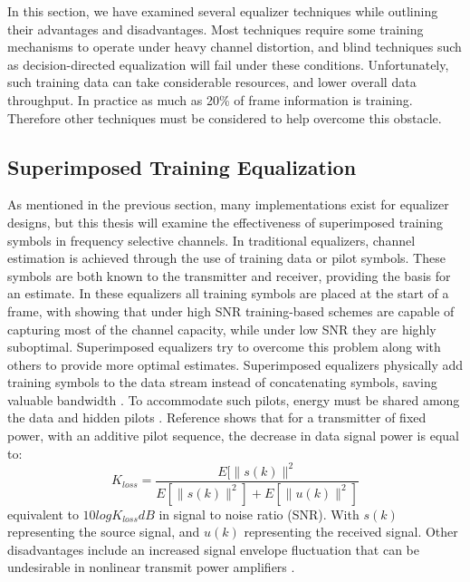 In this section, we have examined several equalizer techniques while outlining their advantages and disadvantages.  Most techniques require some training mechanisms to operate under heavy channel distortion, and blind techniques such as decision-directed equalization will fail under these conditions.  Unfortunately, such training data can take considerable resources, and lower overall data throughput.  In practice as much as 20\% of frame information is training.  Therefore other techniques must be considered to help overcome this obstacle.\\


\subsection{Superimposed Training Equalization}

As mentioned in the previous section, many implementations exist for equalizer designs, but this thesis will examine the effectiveness of superimposed training symbols in frequency selective channels.  In traditional equalizers, channel estimation is achieved through the use of training data or pilot symbols.  These symbols are both known to the transmitter and receiver, providing the basis for an estimate.  In these equalizers all training symbols are placed at the start of a frame, with \cite{16} showing that under high SNR training-based schemes are capable of capturing most of the channel capacity, while under low SNR they are highly suboptimal.  Superimposed equalizers try to overcome this problem along with others to provide more optimal estimates.  Superimposed equalizers physically add training symbols to the data stream instead of concatenating symbols, saving valuable bandwidth \cite{16}.  To accommodate such pilots, energy must be shared among the data and hidden pilots \cite{Ghogho}.  Reference \cite{19} shows that for a transmitter of fixed power, with an additive pilot sequence, the decrease in data signal power is equal to: \[ K_{loss}=\frac{E[\|s(k)\|^{2}}{E[\|s(k)\|^{2}]+E[\|u(k)\|^{2}]}\] equivalent to \(10logK_{loss}dB\) in signal to noise ratio (SNR).  With \(s(k)\) representing the source signal, and \(u(k)\) representing the received signal.  Other disadvantages include an increased signal envelope fluctuation that can be undesirable in nonlinear transmit power amplifiers \cite{17}.\\  

